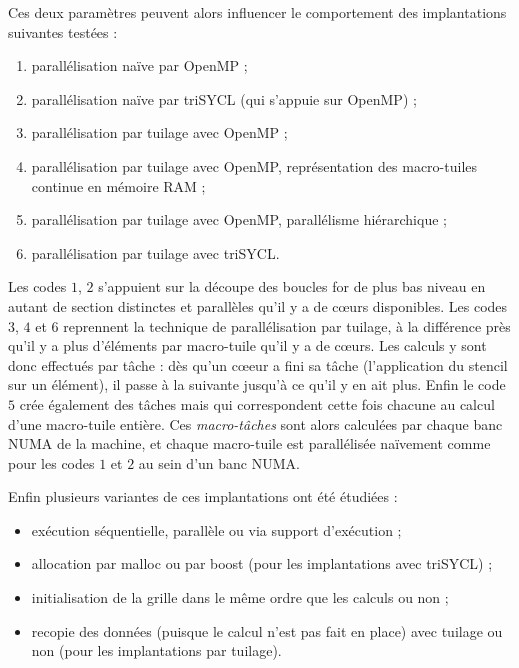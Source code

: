 Ces deux paramètres peuvent alors influencer le comportement des implantations suivantes testées :
\begin{enumerate}
\item parallélisation naïve par \textsf{OpenMP} ;
\item parallélisation naïve par \textsf{triSYCL} (qui s'appuie sur \textsf{OpenMP}) ;
\item parallélisation par tuilage avec \textsf{OpenMP} ;
\item parallélisation par tuilage avec \textsf{OpenMP}, représentation des macro-tuiles continue en mémoire RAM ;
\item parallélisation par tuilage avec \textsf{OpenMP}, parallélisme hiérarchique ;
\item parallélisation par tuilage avec \textsf{triSYCL}.
\end{enumerate}
Les codes $1$, $2$ s'appuient sur la découpe des boucles \textsf{for} de plus bas niveau en autant de section distinctes et parallèles qu'il y a de cœurs disponibles. Les codes $3$, $4$ et $6$ reprennent la technique de parallélisation par tuilage, à la différence près qu'il y a plus d'éléments par macro-tuile qu'il y a de cœurs. Les calculs y sont donc effectués par tâche : dès qu'un cœeur a fini sa tâche (l'application du stencil sur un élément), il passe à la suivante jusqu'à ce qu'il y en ait plus. Enfin le code $5$ crée également des tâches mais qui correspondent cette fois chacune au calcul d'une macro-tuile entière. Ces \emph{macro-tâches} sont alors calculées par chaque banc NUMA de la machine, et chaque macro-tuile est parallélisée naïvement comme pour les codes $1$ et $2$ au sein d'un banc NUMA.

Enfin plusieurs variantes de ces implantations ont été étudiées :
\begin{itemize}
\item exécution séquentielle, parallèle ou via support d'exécution ;
\item allocation par \textsf{malloc} ou par \textsf{boost} (pour les implantations avec \textsf{triSYCL}) ;
\item initialisation de la grille dans le même ordre que les calculs ou non ;
\item recopie des données (puisque le calcul n'est pas fait en place) avec tuilage ou non (pour les implantations par tuilage).
\end{itemize}


